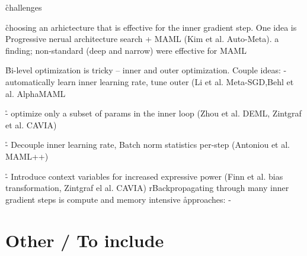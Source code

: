 \r{challenges}

\r{choosing an arhictecture that is effective for the inner gradient step. One idea is Progressive nerual architecture search + MAML (Kim et al. Auto-Meta). a finding; non-standard (deep and narrow) were effective for MAML}

\r{Bi-level optimization is tricky -- inner and outer optimization. Couple ideas: - automatically learn inner learning rate, tune outer (Li et al. Meta-SGD,Behl et al. AlphaMAML} 

\r{- optimize only a subset of params in the inner loop (Zhou et al. DEML, Zintgraf et al. CAVIA)}

\r{- Decouple inner learning rate, Batch norm statistics per-step (Antoniou et al. MAML++)}
 
\r{- Introduce context variables for increased expressive power (Finn et al. bias transformation, Zintgraf el al. CAVIA)}
r{Backpropagating through many inner gradient steps is compute and memory intensive}
\r{approaches: - }



\section{Other / To include}

